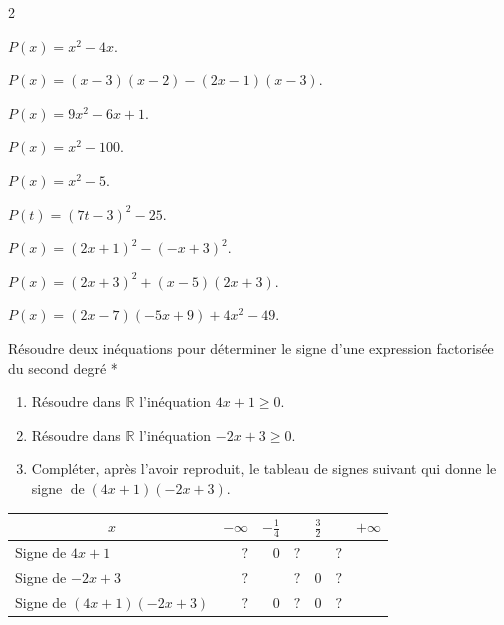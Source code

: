 \documentclass[a4paper,10pt]{book}        %
\begin{document}
\begin{multicols}{2}
	\begin{enumMet}
	\item $P(x)=x^{2}-4 x$.
	\item $P(x)=(x-3)(x-2)-(2 x-1)(x-3)$.
	\item $P(x)=9 x^{2}-6 x+1$.
	\item $P(x)=x^{2}-100$.
	\item $P(x)=x^{2}-5$.
	\item $P(t)=(7 t-3)^{2}-25$.
	\item $P(x)=(2 x+1)^{2}-(-x+3)^{2}$.
	\item $P(x)=(2 x+3)^{2}+(x-5)(2 x+3)$.
	\item $P(x)=(2 x-7)(-5 x+9)+4 x^{2}-49$.
\end{enumMet}
\end{multicols}


Résoudre deux inéquations pour déterminer le signe d'une expression factorisée du second degré *

\begin{enumerate}
	\item Résoudre dans $\mathbb{R}$ l'inéquation $4 x+1 \geq 0$.
	\item Résoudre dans $\mathbb{R}$ l'inéquation $-2 x+3 \geq 0$.
	\item Compléter, après l'avoir reproduit, le tableau de signes suivant qui donne le signe $\operatorname{de}(4 x+1)(-2 x+3)$.
\end{enumerate}

\begin{center}
	\begin{tabular}{|l|rrrrrr|}
		\hline
		\multicolumn{1}{|c|}{$x$} & $-\infty$ & $-\frac{1}{4}$ &  & $\frac{3}{2}$ &  & $+\infty$ \\
		\hline
		Signe de $4 x+1$ & $?$ & 0 & $?$ &  & $?$ &  \\
		\hline
		Signe de $-2 x+3$ & $?$ &  & $?$ & 0 & $?$ &  \\
		\hline
		Signe de $(4 x+1)(-2 x+3)$ & $?$ & 0 & $?$ & 0 & $?$ &  \\
		\hline
	\end{tabular}
\end{center}

 
\end{document}

